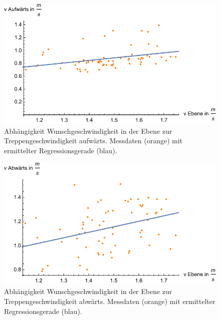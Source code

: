 \begin{figure} \centering 
	\includegraphics[]{abbildungen/regression/2017/auf-ebene.pdf}
	
	\caption{Abhängigkeit Wunschgeschwindigkeit in der Ebene zur Treppengeschwindigkeit aufwärts. Messdaten (orange) mit ermittelter Regressionsgerade (blau). \label{fig:auf-ebene}}
\end{figure}

\begin{figure} \centering 
	\includegraphics[]{abbildungen/regression/2017/ab-ebene.pdf}
	
	\caption{Abhängigkeit Wunschgeschwindigkeit in der Ebene zur Treppengeschwindigkeit abwärts. Messdaten (orange) mit ermittelter Regressionsgerade (blau). \label{fig:ab-ebene}}
\end{figure}

